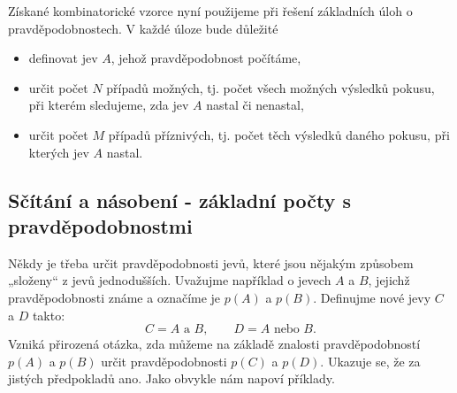       Získané kombinatorické vzorce nyní použijeme při řešení základních úloh o pravděpodobnostech. 
      V každé úloze bude důležité
      \begin{itemize}
        \item definovat jev \(A\), jehož pravděpodobnost počítáme,
        \item určit počet \(N\) případů možných, tj. počet všech možných výsledků pokusu, při 
              kterém sledujeme, zda jev \(A\) nastal či nenastal,
        \item určit počet \(M\) případů příznivých, tj. počet těch výsledků daného pokusu, při 
              kterých jev \(A\) nastal.
      \end{itemize}

      

      

      

    \subsection{Sčítání a násobení - základní počty s pravděpodobnostmi}\label{mai:IchapIVsecIIssecIII}
      Někdy je třeba určit pravděpodobnosti jevů, které jsou nějakým způsobem „složeny“ z jevů
      jednodušších. Uvažujme například o jevech \(A\) a \(B\), jejichž pravděpodobnosti známe a 
      označíme je \(p(A)\) a \(p(B)\). Definujme nové jevy \(C\) a \(D\) takto:
      \begin{equation*}
        C = A \text{ a } B, \qquad D = A \text{ nebo } B.
      \end{equation*}
      Vzniká přirozená otázka, zda můžeme na základě znalosti pravděpodobností \(p(A)\) a \(p(B)\) 
      určit pravděpodobnosti \(p(C)\) a \(p(D)\). Ukazuje se, že za jistých předpokladů ano. Jako 
      obvykle nám napoví příklady.

      
      
